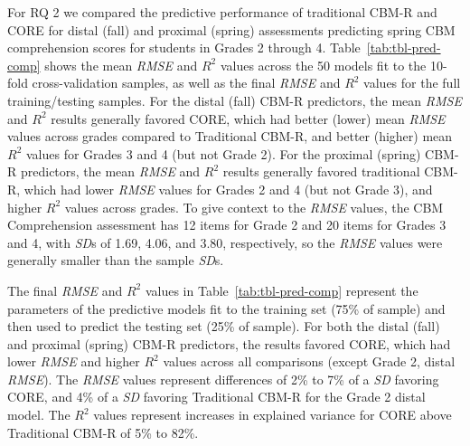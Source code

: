 \documentclass[
  english,
  man, fleqn, noextraspace]{apa6}
\begin{document}
For RQ 2 we compared the predictive performance of traditional CBM-R and CORE for distal (fall) and proximal (spring) assessments predicting spring CBM comprehension scores for students in Grades 2 through 4. Table~\ref{tab:tbl-pred-comp} shows the mean \emph{RMSE} and \(R^2\) values across the 50 models fit to the 10-fold cross-validation samples, as well as the final \emph{RMSE} and \(R^2\) values for the full training/testing samples. For the distal (fall) CBM-R predictors, the mean \emph{RMSE} and \(R^2\) results generally favored CORE, which had better (lower) mean \emph{RMSE} values across grades compared to Traditional CBM-R, and better (higher) mean \(R^2\) values for Grades 3 and 4 (but not Grade 2). For the proximal (spring) CBM-R predictors, the mean \emph{RMSE} and \(R^2\) results generally favored traditional CBM-R, which had lower \emph{RMSE} values for Grades 2 and 4 (but not Grade 3), and higher \(R^2\) values across grades. To give context to the \emph{RMSE} values, the CBM Comprehension assessment has 12 items for Grade 2 and 20 items for Grades 3 and 4, with \emph{SD}s of 1.69, 4.06, and 3.80, respectively, so the \emph{RMSE} values were generally smaller than the sample \emph{SD}s.

The final \emph{RMSE} and \(R^2\) values in Table~\ref{tab:tbl-pred-comp} represent the parameters of the predictive models fit to the training set (75\% of sample) and then used to predict the testing set (25\% of sample). For both the distal (fall) and proximal (spring) CBM-R predictors, the results favored CORE, which had lower \emph{RMSE} and higher \(R^2\) values across all comparisons (except Grade 2, distal \emph{RMSE}). The \emph{RMSE} values represent differences of 2\% to 7\% of a \emph{SD} favoring CORE, and 4\% of a \emph{SD} favoring Traditional CBM-R for the Grade 2 distal model. The \(R^2\) values represent increases in explained variance for CORE above Traditional CBM-R of 5\% to 82\%.
\end{document}
